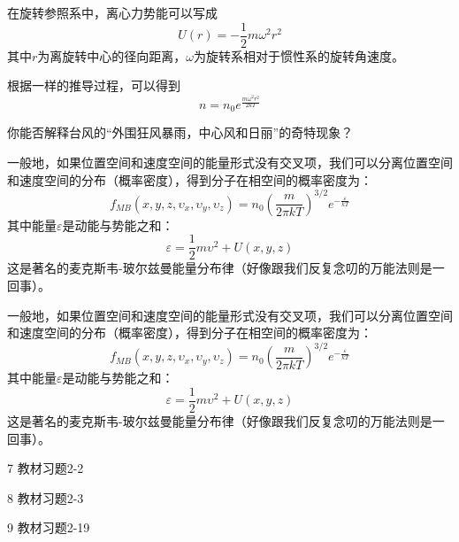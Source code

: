 \documentclass[CJK]{beamer}
\begin{document}
\begin{frame}
\bch
在旋转参照系中，离心力势能可以写成
$$U(r) = -\frac{1}{2}m\omega^2r^2$$
其中$r$为离旋转中心的径向距离，$\omega$为旋转系相对于惯性系的旋转角速度。

\skipline

根据一样的推导过程，可以得到
$$n = n_0 e^{\frac{m\omega^2r^2}{2kT}}$$
\ech
\end{frame}


\begin{frame}
\bch
{}
你能否解释台风的“外围狂风暴雨，中心风和日丽”的奇特现象？
\ech
\end{frame}

\begin{frame}
\bch
一般地，如果位置空间和速度空间的能量形式没有交叉项，我们可以分离位置空间和速度空间的分布（概率密度），得到分子在相空间的概率密度为：
$$f_{MB}(x, y, z,\upsilon_x, \upsilon_y,\upsilon_z) = n_0 \left(\frac{m}{2\pi kT}\right)^{3/2} e^{-\frac{\varepsilon}{kT}} $$
其中能量$\varepsilon$是动能与势能之和：
$$\varepsilon = \frac{1}{2}m\upsilon^2 + U(x,y,z)$$
这是著名的麦克斯韦-玻尔兹曼能量分布律（\wulian 好像跟我们反复念叨的万能法则是一回事）。
\ech
\end{frame}


\begin{frame}
\bch
一般地，如果位置空间和速度空间的能量形式没有交叉项，我们可以分离位置空间和速度空间的分布（概率密度），得到分子在相空间的概率密度为：
$$f_{MB}(x, y, z,\upsilon_x, \upsilon_y,\upsilon_z) = n_0 \left(\frac{m}{2\pi kT}\right)^{3/2} e^{-\frac{\varepsilon}{kT}} $$
其中能量$\varepsilon$是动能与势能之和：
$$\varepsilon = \frac{1}{2}m\upsilon^2 + U(x,y,z)$$
这是著名的麦克斯韦-玻尔兹曼能量分布律（\wulian 好像跟我们反复念叨的万能法则是一回事）。
\ech
\end{frame}

\begin{frame}
\bch

\bitem
\item[7]{教材习题2-2}
\item[8]{教材习题2-3}
\item[9]{教材习题2-19}
\eitem

\ech
\end{frame}
\end{document}
